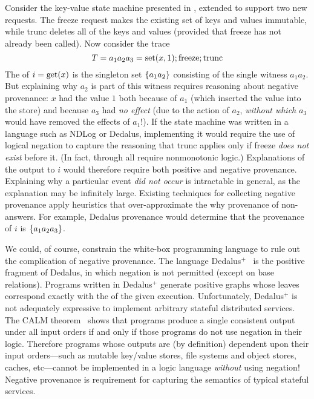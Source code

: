 Consider the key-value state machine presented in ,
extended to support two new requests. The freeze request makes the existing set of keys and
values immutable, while trunc deletes all of the keys and values (provided that
freeze has not already been called). Now consider the trace
\[
  T = a_1 a_2 a_3 = \text{set}(x,1); \text{freeze}; \text{trunc}
\]
The \watprovenance{} of $i = \text{get}(x)$ is the singleton set $\{a_1a_2\}$
consisting of the single witness $a_1a_2$. But explaining why $a_2$ is part of
this witness requires reasoning about negative provenance: $x$ had the value $1$ both
because of $a_1$ (which inserted the value into the store) and because $a_3$
had \emph{no effect} (due to the action of $a_2$, \emph{without which} $a_3$ would have
removed the effects of $a_1$!). If the state machine was written in a language
such as NDLog or Dedalus, implementing it would require the use of logical
negation to capture the reasoning that trunc applies only if freeze \emph{does not exist} before it.
 (In fact,  through
 all require nonmonotonic logic.) Explanations of the output to $i$ would therefore require both positive and negative
provenance. Explaining why a particular event \emph{did not occur} is
intractable in general, as the explanation may be infinitely large.  Existing
techniques for collecting negative provenance apply heuristics that
over-approximate the why provenance of non-answers. For example, Dedalus
provenance would determine that the provenance of $i$ is $\{a_1a_2a_3\}$.

\newcommand{\dedalusplus}{Dedalus$^+$}
We could, of course, constrain the white-box programming language to rule out the
complication of negative provenance.  The language
\dedalusplus~\cite{marczak2012confluence} is the positive fragment of Dedalus,
in which negation is not permitted (except on base relations). Programs written
in \dedalusplus{} generate positive \whyprovenance{} graphs whose leaves
correspond exactly with the \watprovenance{} of the given execution.
Unfortunately, \dedalusplus{} is not adequately expressive to implement
arbitrary stateful distributed services. The CALM
theorem~\cite{alvaro2011consistency,ameloot2013transducers} shows that
programs produce a single consistent output under all input orders
if and only if those programs do not use negation in their logic. Therefore
programs whose outputs are (by definition) dependent upon their input
orders---such as mutable key/value stores, file systems and object stores, caches,
etc---cannot be implemented in a logic language \emph{without} using negation! Negative provenance is requirement for capturing the semantics of typical stateful services.

